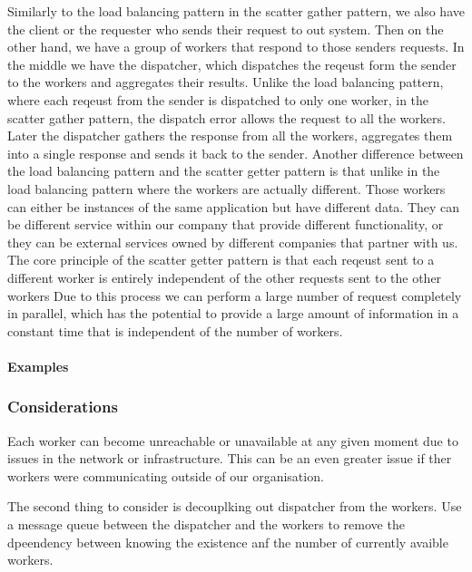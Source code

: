 \documentclass[a4paper, 11pt]{book}
\begin{document}
{    Similarly to the load balancing pattern in the scatter gather pattern, we also have the client or the requester who sends their request to out system.
    Then on the other hand, we have a group of workers that respond to those senders requests.
    In the middle we have the dispatcher, which dispatches the reqeust form the sender to the workers and aggregates their results.
    Unlike the load balancing pattern, where each reqeust from the sender is dispatched to only one worker, in the scatter gather pattern, the dispatch error allows the request to all the workers.
    Later the dispatcher gathers the response from all the workers, aggregates them into a single response and sends it back to the sender.
    Another difference between the load balancing pattern and the scatter getter pattern is that unlike in the load balancing pattern where the workers are actually different.
    Those workers can either be instances of the same application but have different data.
    They can be different service within our company that provide different functionality, or they can be external services owned by different companies that partner with us.
    The core principle of the scatter getter pattern is that each reqeust sent to a different worker is entirely independent of the other requests sent to the other workers
    Due to this process we can perform a large number of request completely in parallel, which has the potential to provide a large amount of information in a constant time that is independent of the number of workers.

    \paragraph{Examples}

    \subsubsection{Considerations}

    Each worker can become unreachable or unavailable at any given moment due to issues in the network or infrastructure.
    This can be an even greater issue if ther workers were communicating outside of our organisation.

    The second thing to consider is decouplking out dispatcher from the workers.
    Use a message queue between the dispatcher and the workers to remove the dpeendency between knowing the existence anf the number of currently avaible workers.

}
\end{document}
